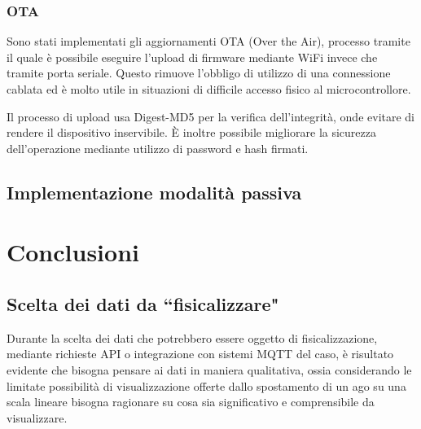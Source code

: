 \documentclass[12pt,a4paper]{report}
\begin{document}
\subsection{OTA}
Sono stati implementati gli aggiornamenti OTA (Over the Air), processo tramite il quale è possibile eseguire l'upload di firmware
mediante WiFi invece che tramite porta seriale. Questo rimuove l'obbligo di utilizzo di una connessione cablata ed è molto utile
in situazioni di difficile accesso fisico al microcontrollore.

Il processo di upload usa Digest-MD5 per la verifica dell'integrità, onde evitare di rendere il dispositivo inservibile. È inoltre possibile
migliorare la sicurezza dell'operazione mediante utilizzo di password e hash firmati. \cite{espota}

\section{Implementazione modalità passiva}


\chapter{Conclusioni}

\section{Scelta dei dati da ``fisicalizzare"}
Durante la scelta dei dati che potrebbero essere oggetto di fisicalizzazione, mediante richieste API o integrazione con sistemi MQTT
del caso, è risultato evidente che bisogna pensare ai dati in maniera qualitativa, ossia considerando le limitate possibilità di visualizzazione
offerte dallo spostamento di un ago su una scala lineare bisogna ragionare su cosa sia significativo e comprensibile da visualizzare.
\end{document}
